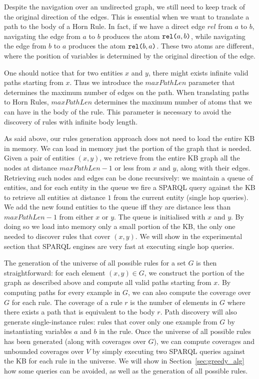 Despite the navigation over an undirected graph, we still need to keep track of the original direction of the edges. This is essential when we want to translate a path to the body of a Horn Rule. In fact, if we have a direct edge $rel$ from $a$ to $b$, navigating the edge from $a$ to $b$ produces the atom $\texttt{rel(}a,b\texttt{)}$, while navigating the edge from $b$ to $a$ produces the atom $\texttt{rel(}b,a\texttt{)}$. These two atoms are different, where the position of variables is determined by the original direction of the edge.

One should notice that for two entities $x$ and $y$, there might exists infinite valid paths starting from $x$. Thus we introduce the $maxPathLen$ parameter that determines the maximum number of edges on the path. When translating paths to Horn Rules, $maxPathLen$ determines the maximum number of atoms that we can have in the body of the rule. This parameter is necessary to avoid the discovery of rules with infinite body length.

As said above, our rules generation approach does not need to load the entire KB in memory. We can load in memory just the portion of the graph that is needed.  Given a pair of entities $(x,y)$, we retrieve from the entire KB graph all the nodes at distance $maxPathLen-1$ or less from $x$ and $y$, along with their edges. Retrieving such nodes and edges can be done recursively: we maintain a queue of entities, and for each entity in the queue we fire a SPARQL query against the KB to retrieve all entities at distance $1$ from the current entity (single hop queries). We add the new found entities to the queue iff they are distance less than  $maxPathLen-1$ from either $x$ or $y$. The queue is initialised with $x$ and $y$. By doing so we load into memory only a small portion of the KB, the only one needed to discover rules that cover $(x,y)$. We will show in the experimental section that SPARQL engines are very fast at executing single hop queries.

The generation of the universe of all possible rules for a set $G$ is then straightforward: for each element $(x,y) \in G$, we construct the portion of the graph as described above and compute all valid paths starting from $x$. By computing paths for every example in $G$, we can also compute the coverage over $G$ for each rule. The coverage of a rule $r$ is the number of elements in $G$ where there exists a path that is equivalent to the body $r$. Path discovery will also generate single-instance rules: rules that cover only one example from $G$ by instantiating variables $a$ and $b$ in the rule. Once the universe of all possible rules has been generated (along with coverages over $G$), we can compute coverages and unbounded coverages over $V$ by simply executing two SPARQL queries against the KB for each rule in the universe. We will show in Section~\ref{sec:greedy_alg} how some queries can be avoided, as well as the generation of all possible rules.


